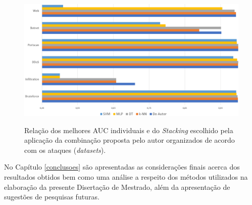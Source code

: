 \begin{figure}[H]
\centering
\caption{Relação dos melhores AUC individuais e do \textit{Stacking} escolhido pela aplicação da combinação proposta pelo autor organizados de acordo com os ataques (\textit{datasets}).}
\includegraphics[width=\textwidth,keepaspectratio]{figs/mehores_resultados_defesa.png}
\newline {}\label{fig:melhores_resultados_dfesa}
\end{figure}



No Capítulo \ref{conclusoes} são apresentadas as considerações finais acerca dos resultados obtidos bem como uma análise a respeito dos  métodos utilizados na elaboração da presente Disertação de Mestrado, além da apresentação de sugestões de pesquisas futuras. 


